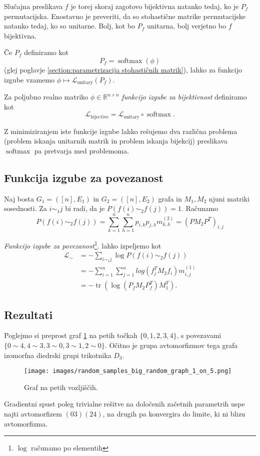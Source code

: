 \documentclass[mat2, tisk]{fmfdelo}
\newcommand{\R}{\mathbb R}
\newcommand{\Loss}[1]{\mathcal L _\text{#1}}
\begin{document}
Slučajna preslikava $f$ je torej skoraj zagotovo bijektivna natanko tedaj, ko je $P_f$ permutacijska. Enostavno je preveriti, da so stohastične matrike permutacijske natanko tedaj, ko so unitarne. Bolj, kot bo $P_f$ unitarna, bolj verjetno bo $f$ bijektivna. 

Če $P_f$ definiramo kot 
$$P_f = \operatorname{softmax}(\phi)$$(glej poglavje \ref{section:parametrizacija stohastičnih matrik}), lahko za funkcijo izgube vzamemo $\phi \mapsto \Loss{unitary}(P_f)$. 

\begin{definicija}
    Za poljubno realno matriko $\phi \in \R^{n \times n}$ \emph{funkcijo izgube za bijektivnost} definiramo kot 
    $$
    \Loss{bijective} = \Loss{unitary} \circ \operatorname{softmax}.
    $$
\end{definicija}
Z minimiziranjem iste funkcije izgube lahko rešujemo dva različna problema (problem iskanja unitarnih matrik in problem iskanja bijekcij) preslikava $\operatorname{softmax}$  pa pretvarja med problemoma. 
\subsection{Funkcija izgube za povezanost}
    Naj bosta $G_1 = ([n], E_1)$ in $G_2 = ([n], E_2)$ grafa  in $M_1, M_2$ njuni matriki sosednosti. 
    Za $i \sim_1 j$ bi radi, da je $P(f(i)  \sim_2 f(j)) = 1$.
    Računamo 
    $$
    P(f(i) \sim_2 f(j)) = \sum_{k= 1}^n \sum_{h = 1}^n p_{i, k} p_{j, h} m_{k,h}^{(2)} 
= (P M_2 P^T)_{i, j}
    $$
    \begin{definicija}
        \emph{Funkcijo izgube za povezanost}\footnote{$\log$ računamo po elementih}. lahko izpeljemo kot 
        \begin{align*}
    \mathcal{L}_\sim &= -\sum_{i \sim_1 j} \log P(f(i) \sim_2 f(j)) 
    \\&= -\sum_{i=1}^n\sum_{j=1}^n log(f_j^T M_2 f_i)m_{i,j}^{(1)}\\&= -\operatorname{tr}(\log(P_fM_2P_f^T) M_1^T). 
\end{align*}
    \end{definicija}
\subsection{Rezultati}
\begin{primer}
    Poglejmo si preprost graf \ref{fig:primer_grafa} na petih točkah $\{0,1,2,3,4\}$, s povezavami $\{0 \sim 4, 4 \sim 3, 3 \sim 0, 3 \sim 1, 2 \sim 0\}$. Očitno je grupa avtomorfizmov tega grafa izomorfna diedrski grupi trikotnika $D_3$. 
    \begin{figure}[h!]
        \centering
        \texttt{[image: images/random\_samples\_big\_random\_graph\_1\_on\_5.png]}
        \caption{Graf na petih vozljiščih.}
        \label{fig:primer_grafa}
    \end{figure}
    
       Gradientni spust poleg trivialne rešitve na določenih začetnih parametrih uspe najti avtomorfizem $(03)(24)$, na drugih pa konvergira do limite, ki ni blizu avtomorfizma. 
    
\end{primer}
\end{document}
